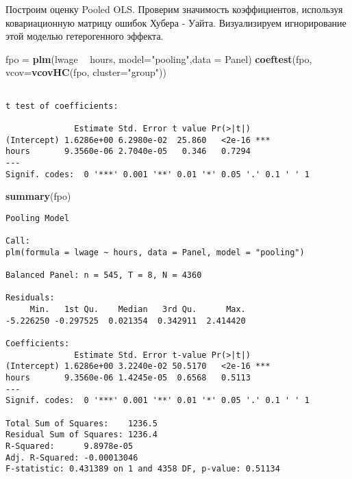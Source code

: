 \documentclass[]{article}
\newenvironment{Shaded}{\begin{snugshade}}{\end{snugshade}}
\newcommand{\DataTypeTok}[1]{\textcolor[rgb]{0.13,0.29,0.53}{#1}}
\newcommand{\KeywordTok}[1]{\textcolor[rgb]{0.13,0.29,0.53}{\textbf{#1}}}
\newcommand{\NormalTok}[1]{#1}
\newcommand{\OperatorTok}[1]{\textcolor[rgb]{0.81,0.36,0.00}{\textbf{#1}}}
\newcommand{\StringTok}[1]{\textcolor[rgb]{0.31,0.60,0.02}{#1}}
\begin{document}
Построим оценку Pooled OLS. Проверим значимость коэффициентов, используя
ковариационную матрицу ошибок Хубера - Уайта. Визуализируем
игнорирование этой моделью гетерогенного эффекта.

\begin{Shaded}
\begin{Highlighting}[]
\NormalTok{fpo =}\StringTok{ }\KeywordTok{plm}\NormalTok{(lwage }\OperatorTok{~}\StringTok{ }\NormalTok{hours, }\DataTypeTok{model=}\StringTok{"pooling"}\NormalTok{,}\DataTypeTok{data =}\NormalTok{ Panel)}
\KeywordTok{coeftest}\NormalTok{(fpo, }\DataTypeTok{vcov=}\KeywordTok{vcovHC}\NormalTok{(fpo, }\DataTypeTok{cluster=}\StringTok{"group"}\NormalTok{))}
\end{Highlighting}
\end{Shaded}

\begin{verbatim}

t test of coefficients:

              Estimate Std. Error t value Pr(>|t|)    
(Intercept) 1.6286e+00 6.2980e-02  25.860   <2e-16 ***
hours       9.3560e-06 2.7040e-05   0.346   0.7294    
---
Signif. codes:  0 '***' 0.001 '**' 0.01 '*' 0.05 '.' 0.1 ' ' 1
\end{verbatim}

\begin{Shaded}
\begin{Highlighting}[]
\KeywordTok{summary}\NormalTok{(fpo)}
\end{Highlighting}
\end{Shaded}

\begin{verbatim}
Pooling Model

Call:
plm(formula = lwage ~ hours, data = Panel, model = "pooling")

Balanced Panel: n = 545, T = 8, N = 4360

Residuals:
     Min.   1st Qu.    Median   3rd Qu.      Max. 
-5.226250 -0.297525  0.021354  0.342911  2.414420 

Coefficients:
              Estimate Std. Error t-value Pr(>|t|)    
(Intercept) 1.6286e+00 3.2240e-02 50.5170   <2e-16 ***
hours       9.3560e-06 1.4245e-05  0.6568   0.5113    
---
Signif. codes:  0 '***' 0.001 '**' 0.01 '*' 0.05 '.' 0.1 ' ' 1

Total Sum of Squares:    1236.5
Residual Sum of Squares: 1236.4
R-Squared:      9.8978e-05
Adj. R-Squared: -0.00013046
F-statistic: 0.431389 on 1 and 4358 DF, p-value: 0.51134
\end{verbatim}
\end{document}
